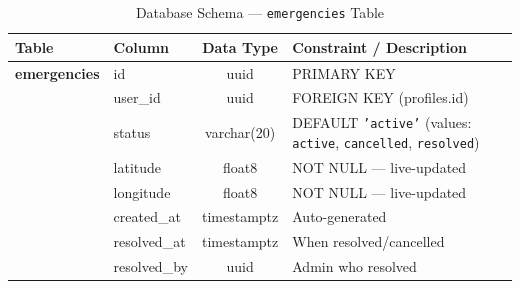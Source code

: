 \documentclass[11pt, a4paper]{report}
\begin{document}
\begin{table}[ht]
\centering
\caption{Database Schema --- \texttt{emergencies} Table}
\label{tab:emergencies}
\begin{tabularx}{\textwidth}{llcX}
\toprule
\textbf{Table} & \textbf{Column} & \textbf{Data Type} & \textbf{Constraint / Description} \\
\midrule
\textbf{emergencies} & id & uuid & PRIMARY KEY \\
& user\_id & uuid & FOREIGN KEY (profiles.id) \\
& status & varchar(20) & DEFAULT \texttt{'active'} (values: \texttt{active}, \texttt{cancelled}, \texttt{resolved}) \\
& latitude & float8 & NOT NULL --- live-updated \\
& longitude & float8 & NOT NULL --- live-updated \\
& created\_at & timestamptz & Auto-generated \\
& resolved\_at & timestamptz & When resolved/cancelled \\
& resolved\_by & uuid & Admin who resolved \\
\bottomrule
\end{tabularx}
\end{table}
\end{document}
